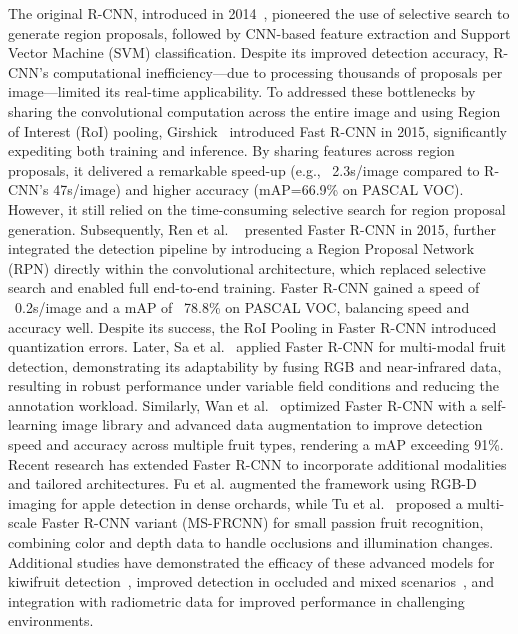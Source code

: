 \documentclass[a4paper,fleqn]{cas-dc}
\begin{document}
The original R-CNN, introduced in 2014~\cite{girshick2014rcnn}, pioneered the use of selective search to generate region proposals, followed by CNN-based feature extraction and Support Vector Machine (SVM) classification. Despite its improved detection accuracy, R-CNN's computational inefficiency—due to processing thousands of proposals per image—limited its real-time applicability.
To addressed these bottlenecks by sharing the convolutional computation across the entire image and using Region of Interest (RoI) pooling, Girshick~\cite{girshick2015fast} introduced Fast R-CNN in 2015, significantly expediting both training and inference. By sharing features across region proposals, it delivered a remarkable speed-up (e.g., ~2.3s/image compared to R-CNN's 47s/image) and higher accuracy (mAP=66.9\% on PASCAL VOC). However, it still relied on the time-consuming selective search for region proposal generation.
Subsequently, Ren et al. ~\cite{ren2015faster} presented Faster R-CNN in 2015, further integrated the detection pipeline by introducing a Region Proposal Network (RPN) directly within the convolutional architecture, which replaced selective search and enabled full end-to-end training. Faster R-CNN gained a speed of ~0.2s/image and a mAP of ~78.8\% on PASCAL VOC, balancing speed and accuracy well. Despite its success, the RoI Pooling in Faster R-CNN introduced quantization errors. 
Later, Sa et al.~\cite{sa2016deepfruits} applied Faster R-CNN for multi-modal fruit detection, demonstrating its adaptability by fusing RGB and near-infrared data, resulting in robust performance under variable field conditions and reducing the annotation workload. Similarly, Wan et al.~\cite{wan2020faster} optimized Faster R-CNN with a self-learning image library and advanced data augmentation to improve detection speed and accuracy across multiple fruit types, rendering a mAP exceeding 91\%.
Recent research has extended Faster R-CNN to incorporate additional modalities and tailored architectures. Fu et al.\cite{fu2020faster} augmented the framework using RGB-D imaging for apple detection in dense orchards, while Tu et al.~\cite{tu2020passion} proposed a multi-scale Faster R-CNN variant (MS-FRCNN) for small passion fruit recognition, combining color and depth data to handle occlusions and illumination changes. Additional studies have demonstrated the efficacy of these advanced models for kiwifruit detection~\cite{fu2018kiwifruit}, improved detection in occluded and mixed scenarios~\cite{gene2019multi, mu2020intact}, and integration with radiometric data for improved performance in challenging environments.
\end{document}

